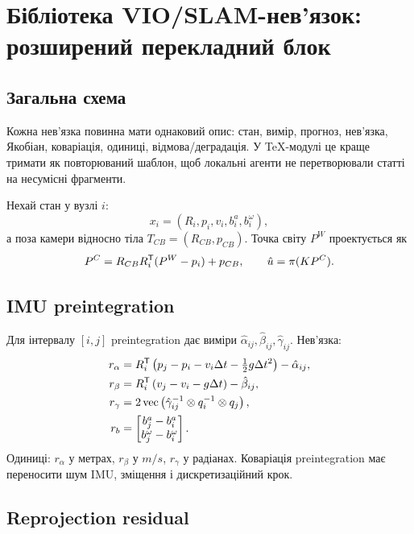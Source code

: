 \section{Бібліотека VIO/SLAM-нев'язок: розширений перекладний блок}

\subsection{Загальна схема}

Кожна нев'язка повинна мати однаковий опис: стан, вимір, прогноз, нев'язка, Якобіан, коваріація, одиниці, відмова/деградація. У TeX-модулі це краще тримати як повторюваний шаблон, щоб локальні агенти не перетворювали статті на несумісні фрагменти.

Нехай стан у вузлі $i$:
\begin{equation}
 x_i=(R_i,p_i,v_i,b^a_i,b^\omega_i),
\end{equation}
а поза камери відносно тіла $T_{CB}=(R_{CB},p_{CB})$. Точка світу $P^W$ проектується як
\begin{equation}
 P^C = R_{CB}R_i^{\mathsf T}(P^W-p_i)+p_{CB},
 \qquad \hat u=\pi(KP^C).
\end{equation}

\subsection{IMU preintegration}

Для інтервалу $[i,j]$ preintegration дає виміри $\hat\alpha_{ij},\hat\beta_{ij},\hat\gamma_{ij}$. Нев'язка:
\begin{align}
 r_\alpha &= R_i^{\mathsf T}\left(p_j-p_i-v_i\Delta t-\tfrac12g\Delta t^2\right)-\hat\alpha_{ij},\\
 r_\beta &= R_i^{\mathsf T}\left(v_j-v_i-g\Delta t\right)-\hat\beta_{ij},\\
 r_\gamma &= 2\operatorname{vec}\left(\hat\gamma_{ij}^{-1}\otimes q_i^{-1}\otimes q_j\right),\\
 r_b &= \begin{bmatrix}b^a_j-b^a_i\\b^\omega_j-b^\omega_i\end{bmatrix}.
\end{align}
Одиниці: $r_\alpha$ у метрах, $r_\beta$ у $m/s$, $r_\gamma$ у радіанах. Коваріація preintegration має переносити шум IMU, зміщення і дискретизаційний крок.

\subsection{Reprojection residual}

